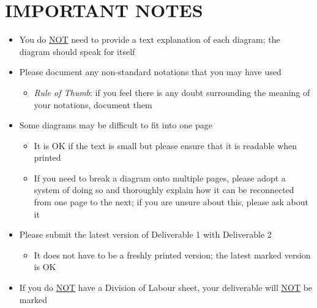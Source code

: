 \documentclass[]{article}
\begin{document}
\section*{IMPORTANT NOTES}
\begin{itemize}
	\item You do \underline{NOT} need to provide a text explanation of each
diagram; the diagram should speak for itself
	\item Please document any non-standard notations that you may have used
	\begin{itemize}
		\item \emph{Rule of Thumb}: if you feel there is any doubt surrounding the
meaning of your notations, document them
	\end{itemize}
	\item Some diagrams may be difficult to fit into one page
	\begin{itemize}
		\item It is OK if the text is small but please ensure that it is readable when
printed
		\item If you need to break a diagram onto multiple pages, please adopt a
system of doing so and thoroughly explain how it can be reconnected from one
page to the next; if you are unsure about this, please ask about it
	\end{itemize}
	\item Please submit the latest version of Deliverable 1 with Deliverable 2
	\begin{itemize}
		\item It does not have to be a freshly printed version; the latest marked
version is OK
	\end{itemize}
	\item If you do \underline{NOT} have a Division of Labour sheet, your
deliverable will \underline{NOT} be marked
\end{itemize}
\end{document}
